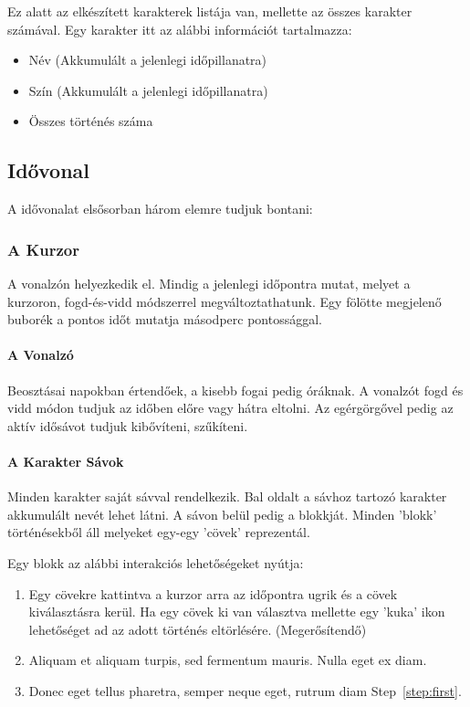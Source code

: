 Ez alatt az elkészített karakterek listája van, mellette az összes karakter számával. Egy karakter itt az alábbi információt tartalmazza:

\begin{itemize}
	\item Név (Akkumulált a jelenlegi időpillanatra)
	\item Szín (Akkumulált a jelenlegi időpillanatra)
	\item Összes történés száma
\end{itemize}

\subsection{Idővonal} \label{section:ui-timeline}

A idővonalat elsősorban három elemre tudjuk bontani:

\subsubsection{A Kurzor}

A vonalzón helyezkedik el. Mindig a jelenlegi időpontra mutat, melyet a kurzoron, fogd-és-vidd módszerrel megváltoztathatunk. Egy fölötte megjelenő buborék a pontos időt mutatja másodperc pontossággal.

\paragraph{A Vonalzó}

Beosztásai napokban értendőek, a kisebb fogai pedig óráknak. A vonalzót fogd és vidd módon tudjuk az időben előre vagy hátra eltolni. Az egérgörgővel pedig az aktív idősávot tudjuk kibővíteni, szűkíteni.

\paragraph{A Karakter Sávok}

Minden karakter saját sávval rendelkezik. Bal oldalt a sávhoz tartozó karakter akkumulált nevét lehet látni. A sávon belül pedig a blokkját. Minden 'blokk' történésekből áll melyeket egy-egy 'cövek' reprezentál.

Egy blokk az alábbi interakciós lehetőségeket nyútja:
\begin{enumerate}
	\item Egy cövekre kattintva a kurzor arra az időpontra ugrik és a cövek kiválasztásra kerül. Ha egy cövek ki van választva mellette egy 'kuka' ikon lehetőséget ad az adott történés eltörlésére. (Megerősítendő)
	\item Aliquam et aliquam turpis, sed fermentum mauris. Nulla eget ex diam.
	\item Donec eget tellus pharetra, semper neque eget, rutrum diam Step~\ref{step:first}.
\end{enumerate}


